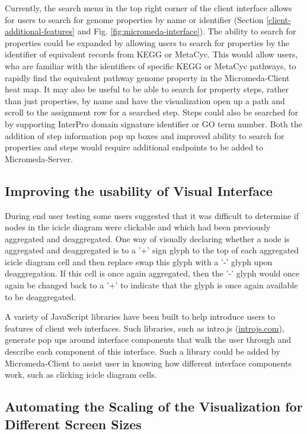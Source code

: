 Currently, the search menu in the top right corner of the client interface allows for users to search for genome properties by name or identifier (Section \ref{client-additional-features} and Fig. \ref{fig:micromeda-interface}). The ability to search for properties could be expanded by allowing users to search for properties by the identifier of equivalent records from KEGG or MetaCyc. This would allow users, who are familiar with the identifiers of specific KEGG or MetaCyc pathways, to rapidly find the equivalent pathway genome property in the Micromeda-Client heat map. It may also be useful to be able to search for property steps, rather than just properties, by name and have the visualization open up a path and scroll to the assignment row for a searched step. Steps could also be searched for by supporting InterPro domain signature identifier or GO term number. Both the addition of step information pop up boxes and improved ability to search for properties and steps would require additional endpoints to be added to Micromeda-Server.

\subsection{Improving the usability of Visual Interface}

During end user testing some users suggested that it was difficult to determine if nodes in the icicle diagram were clickable and which had been previously aggregated and deaggregated. One way of visually declaring whether a node is aggregated and deaggregated is to a '+' sign glyph to the top of each aggregated icicle diagram cell and then replace swap this glyph with a '-' glyph upon deaggregation. If this cell is once again aggregated, then the '-' glyph would once again be changed back to a '+' to indicate that the glyph is once again available to be deaggregated.

A variety of JavaScript libraries have been built to help introduce users to features of client web interfaces. Such libraries, such as intro.js \cite{mehrabani} (\href{introjs.com}{introjs.com}), generate pop ups around interface components that walk the user through and describe each component of this interface. Such a library could be added by Micromeda-Client to assist user in knowing how different interface components work, such as clicking icicle diagram cells.

\subsection{Automating the Scaling of the Visualization for Different Screen Sizes}

